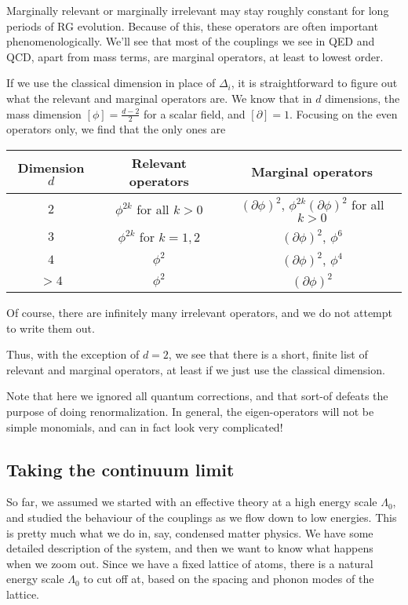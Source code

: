 \documentclass[a4paper]{article}
\begin{document}
Marginally relevant or marginally irrelevant may stay roughly constant for long periods of RG evolution. Because of this, these operators are often important phenomenologically. We'll see that most of the couplings we see in QED and QCD, apart from mass terms, are marginal operators, at least to lowest order.

If we use the classical dimension in place of $\Delta_i$, it is straightforward to figure out what the relevant and marginal operators are. We know that in $d$ dimensions, the mass dimension $[\phi] = \frac{d - 2}{2}$ for a scalar field, and $[\partial] = 1$. Focusing on the even operators only, we find that the only ones are
\begin{center}
  \begin{tabular}{ccc}
    \toprule
    Dimension $d$ & Relevant operators & Marginal operators\\
    \midrule
    $2$ & $\phi^{2k}$ for all $k > 0$ & $(\partial \phi)^2$, $\phi^{2k} (\partial \phi)^2$ for all $k > 0$\\
    $3$ & $\phi^{2k}$ for $k = 1, 2$ & $(\partial \phi)^2$, $\phi^6$\\
    $4$ & $\phi^2$ & $(\partial \phi)^2$, $\phi^4$\\
    $> 4$ & $\phi^2$ & $(\partial \phi)^2$\\
    \bottomrule
  \end{tabular}
\end{center}
Of course, there are infinitely many irrelevant operators, and we do not attempt to write them out.

Thus, with the exception of $d = 2$, we see that there is a short, finite list of relevant and marginal operators, at least if we just use the classical dimension.

Note that here we ignored all quantum corrections, and that sort-of defeats the purpose of doing renormalization. In general, the eigen-operators will not be simple monomials, and can in fact look very complicated!

\subsection{Taking the continuum limit}
So far, we assumed we started with an effective theory at a high energy scale $\Lambda_0$, and studied the behaviour of the couplings as we flow down to low energies. This is pretty much what we do in, say, condensed matter physics. We have some detailed description of the system, and then we want to know what happens when we zoom out. Since we have a fixed lattice of atoms, there is a natural energy scale $\Lambda_0$ to cut off at, based on the spacing and phonon modes of the lattice.
\end{document}
